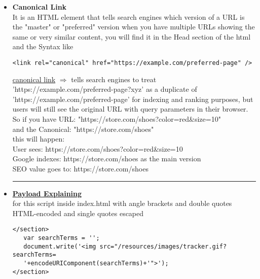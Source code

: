 \documentclass{article}
\begin{document}
\begin{itemize}
	\item \textbf{Canonical Link} 
	\\It is an HTML element that tells search engines which version of a URL is the "master" or "preferred" version when you have multiple URLs showing the same or very similar content, you will find it in the Head section of the html and the Syntax like
	        \begin{lstlisting}[frame=single]
   <link rel="canonical" href="https://example.com/preferred-page" />
            \end{lstlisting}        
\underline{canonical link} $\Longrightarrow$ tells search engines to treat 'https://example.com/preferred-page?xyz' as a duplicate of 'https://example.com/preferred-page' for indexing and ranking purposes, but users will still see the original URL with query parameters in their browser.
\\So if you have URL: "https://store.com/shoes?color=red\&size=10" 
\\and the Canonical: "https://store.com/shoes"
\\this will happen:
  \\User sees: https://store.com/shoes?color=red\&size=10
  \\Google indexes: https://store.com/shoes as the main version
  \\SEO value goes to: https://store.com/shoes
  \\ \rule{5cm}{0.4pt}
  \item \textbf{\underline{Payload Explaining}}
  \\for this script inside index.html with angle brackets and double quotes HTML-encoded and single quotes escaped
  	        \begin{lstlisting}[frame=single]
</section>
   var searchTerms = '';
   document.write('<img src="/resources/images/tracker.gif?searchTerms=
   '+encodeURIComponent(searchTerms)+'">');
</section>
            \end{lstlisting}
            

\end{itemize}
\end{document}
